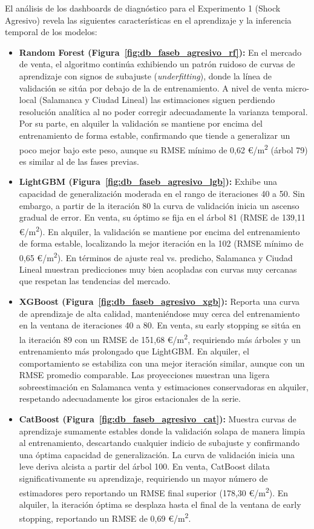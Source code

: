 \documentclass[a4paper,11pt,openany]{book}
\begin{document}
El análisis de los dashboards de diagnóstico para el Experimento 1 (Shock Agresivo) revela las siguientes características en el aprendizaje y la inferencia temporal de los modelos:
\begin{itemize}
    \item \textbf{Random Forest (Figura~\ref{fig:db_faseb_agresivo_rf}):} En el mercado de venta, el algoritmo continúa exhibiendo un patrón ruidoso de curvas de aprendizaje con signos de subajuste (\textit{underfitting}), donde la línea de validación se sitúa por debajo de la de entrenamiento. A nivel de venta micro-local (Salamanca y Ciudad Lineal) las estimaciones siguen perdiendo resolución analítica al no poder corregir adecuadamente la varianza temporal. Por su parte, en alquiler la validación se mantiene por encima del entrenamiento de forma estable, confirmando que tiende a generalizar un poco mejor bajo este peso, aunque su RMSE mínimo de 0,62 €/m\textsuperscript{2} (árbol 79) es similar al de las fases previas.
    \item \textbf{LightGBM (Figura~\ref{fig:db_faseb_agresivo_lgb}):} Exhibe una capacidad de generalización moderada en el rango de iteraciones 40 a 50. Sin embargo, a partir de la iteración 80 la curva de validación inicia un ascenso gradual de error. En venta, su óptimo se fija en el árbol 81 (RMSE de 139,11 €/m\textsuperscript{2}). En alquiler, la validación se mantiene por encima del entrenamiento de forma estable, localizando la mejor iteración en la 102 (RMSE mínimo de 0,65 €/m\textsuperscript{2}). En términos de ajuste real vs. predicho, Salamanca y Ciudad Lineal muestran predicciones muy bien acopladas con curvas muy cercanas que respetan las tendencias del mercado.
    \item \textbf{XGBoost (Figura~\ref{fig:db_faseb_agresivo_xgb}):} Reporta una curva de aprendizaje de alta calidad, manteniéndose muy cerca del entrenamiento en la ventana de iteraciones 40 a 80. En venta, su early stopping se sitúa en la iteración 89 con un RMSE de 151,68 €/m\textsuperscript{2}, requiriendo más árboles y un entrenamiento más prolongado que LightGBM. En alquiler, el comportamiento se estabiliza con una mejor iteración similar, aunque con un RMSE promedio comparable. Las proyecciones muestran una ligera sobreestimación en Salamanca venta y estimaciones conservadoras en alquiler, respetando adecuadamente los giros estacionales de la serie.
    \item \textbf{CatBoost (Figura~\ref{fig:db_faseb_agresivo_cat}):} Muestra curvas de aprendizaje sumamente estables donde la validación solapa de manera limpia al entrenamiento, descartando cualquier indicio de subajuste y confirmando una óptima capacidad de generalización. La curva de validación inicia una leve deriva alcista a partir del árbol 100. En venta, CatBoost dilata significativamente su aprendizaje, requiriendo un mayor número de estimadores pero reportando un RMSE final superior (178,30 €/m\textsuperscript{2}). En alquiler, la iteración óptima se desplaza hasta el final de la ventana de early stopping, reportando un RMSE de 0,69 €/m\textsuperscript{2}.
\end{itemize}
\end{document}
